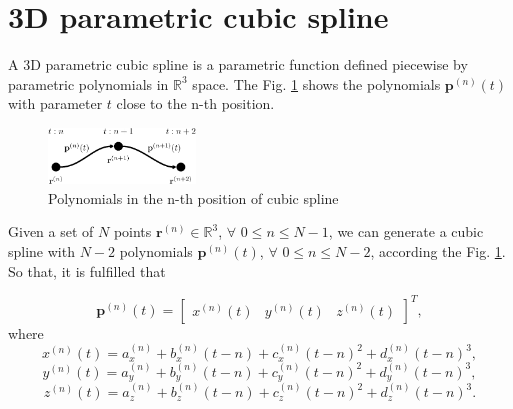 \section{3D parametric cubic spline }
A 3D parametric cubic spline is a parametric function defined piecewise by parametric polynomials in $\mathbb{R}^{3}$ space.
The Fig. \ref{fig:3DSplinePoly} shows the polynomials $\mathbf{p}^{(n)}(t)$ with parameter $t$ 
close to the n-th position.
\begin{figure}[H]
    \centering
    \includegraphics[width=0.35\textwidth]{boveda/Diagrama1.eps}
    \caption{Polynomials in the n-th position of cubic spline}
    \label{fig:3DSplinePoly}
\end{figure}

Given a set of $N$ points $\mathbf{r}^{(n)}\in\mathbb{R}^{3}$, $\forall$ $0\leq n \leq N-1$, 
we can generate a cubic spline with $N-2$ polynomials $\mathbf{p}^{(n)}(t)$, $\forall$ $0\leq n \leq N-2$, 
according the Fig. \ref{fig:3DSplinePoly}.
So that, it is fulfilled that 

\begin{equation}
\mathbf{p}^{(n)}(t)=
\begin{bmatrix}
x^{(n)}(t) & y^{(n)}(t) & z^{(n)}(t)
\end{bmatrix}^{T},
\end{equation}
where
\begin{equation}
x^{(n)}(t)=a_{x}^{(n)}+b_{x}^{(n)}(t-n)+c_{x}^{(n)}(t-n)^{2}+d_{x}^{(n)}(t-n)^{3},
\end{equation}
\begin{equation}
y^{(n)}(t)=a_{y}^{(n)}+b_{y}^{(n)}(t-n)+c_{y}^{(n)}(t-n)^{2}+d_{y}^{(n)}(t-n)^{3},
\end{equation}
\begin{equation}
z^{(n)}(t)=a_{z}^{(n)}+b_{z}^{(n)}(t-n)+c_{z}^{(n)}(t-n)^{2}+d_{z}^{(n)}(t-n)^{3}.
\end{equation}

